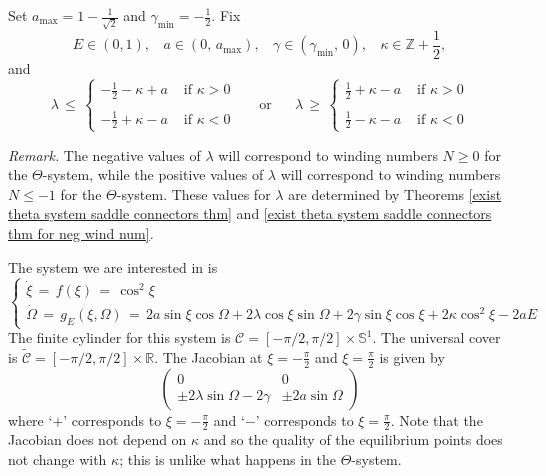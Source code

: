 \documentclass[11 pt]{article}
\renewcommand\l{\lambda}
\renewcommand\({\left(}
\renewcommand\){\right)}
\newcommand\wt{\widetilde}
\newcommand\<{\langle}
\renewcommand\>{\rangle}
\renewcommand\l{\lambda}
\newcommand\g{\gamma}
\newcommand\8{\infty}
\newcommand{\R}{\mathbb R}
\newcommand{\mc}{\mathcal}
\newcommand{\Z}{\mathbb{Z}}
\newcommand{\Sset}{\mathbb{S}}
\newcommand{\half}{\frac{1}{2}}
\begin{document}
Set $a_{\text{max}} = 1 - \frac{1}{\sqrt{2}}$ and $\gamma_{\text{min}} =-\frac{1}{2}$.
Fix
\[
E \in (0,1), \:\:\:\: a \in (0,\, a_{\text{max}}),  \:\:\:\:  \g \in (\gamma_{\text{min}},\,0), \:\:\:\: \kappa \in \Z + \half,
\]
and 
\[ \l \,\leq\, \left\{
  \begin{array}{ll}
      -\frac{1}{2} - \kappa + a  & \text{ if } \kappa > 0   \\\\
      -\frac{1}{2} + \kappa -a & \text{ if } \kappa < 0    
\end{array} 
\right. \:\:\:\:\:\: \text{ or } \:\:\:\:\:\: \l \,\geq\, \left\{
  \begin{array}{ll}
      \frac{1}{2} + \kappa - a  & \text{ if } \kappa > 0   \\\\
      \frac{1}{2} - \kappa -a & \text{ if } \kappa < 0    
\end{array} 
\right. \]


\medskip
\medskip

\noindent\emph{Remark.} The negative values of $\l$ will correspond to winding numbers $N \geq 0$ for the $\Theta$-system, while the positive values of $\l$ will correspond to winding numbers $N \leq -1$ for the $\Theta$-system. These values for $\lambda$ are determined by Theorems \ref{exist theta system saddle connectors thm} and \ref{exist theta system saddle connectors thm for neg wind num}.

\medskip
\medskip

 \noindent The system we are interested in is
\[  \left\{
 \begin{array}{ll}
      \dot{\xi} \,=\, f(\xi) \,=\, \cos^2 \xi   \\
      \dot{\Omega} \,=\, g_E(\xi,\Omega) \,=\, 2a\sin \xi \cos \Omega + 2\lambda \cos \xi \sin \Omega + 2\gamma\sin\xi\cos\xi + 2\kappa\cos^2 \xi - 2aE    
\end{array} 
\right. \]
The finite cylinder for this system is $\mc{C} = [-\pi/2, \pi/2] \times \Sset^1$. The universal cover is $\wt{\mc{C}} = [-\pi/2, \pi/2] \times \R$. The Jacobian at $\xi = -\frac{\pi}{2}$ and $\xi = \frac{\pi}{2}$ is given by 
\[
\begin{pmatrix}
0 & 0
\\
\pm 2\lambda \sin \Omega - 2\gamma & \pm 2a \sin \Omega
\end{pmatrix}
\]
where `$+$' corresponds to $\xi = -\frac{\pi}{2}$ and `$-$' corresponds to $\xi = \frac{\pi}{2}$. Note that the Jacobian does not depend on $\kappa$ and so the quality of the equilibrium points does not change with $\kappa$; this is unlike what happens in the $\Theta$-system. 
\end{document}
